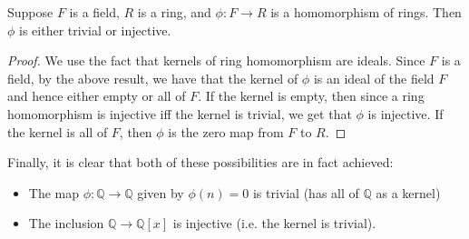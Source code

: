 \documentclass[12pt]{article}
\newcommand{\mb}{\mathbb}
\newcommand{\ra}{\rightarrow}
\newcommand{\Q}{\mb{Q}}
\newcommand{\<}{\langle}
\renewcommand{\>}{\rangle}
\begin{document}
Suppose $F$ is a field, $R$ is a ring, and $\phi\colon F\rightarrow R$ is a homomorphism of rings.  Then $\phi$ is either trivial or injective.

\begin{proof}
We use the fact that kernels of ring homomorphism are ideals.  Since $F$ is a field, by the above result, we have that the kernel of $\phi$ is an ideal of the field $F$ and hence either empty or all of $F$.  If the kernel is empty, then since a ring homomorphism is injective iff the kernel is trivial, we get that $\phi$ is injective.  If the kernel is all of $F$, then $\phi$ is the zero map from $F$ to $R$.
\end{proof}

Finally, it is clear that both of these possibilities are in fact achieved:
\begin{itemize}
\item The map $\phi:\Q\ra \Q$ given by $\phi(n)=0$ is trivial (has all of $\Q$ as a kernel)
\item The inclusion $\Q\ra \Q[x]$ is injective (i.e. the kernel is trivial).
\end{itemize}
\end{document}
